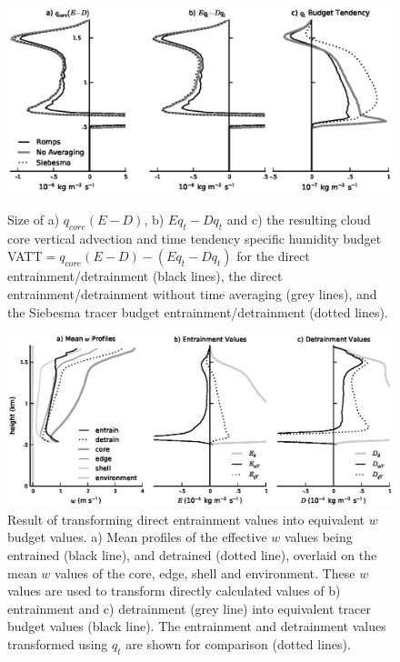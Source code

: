 \documentclass[12pt]{article}
\begin{document}
\begin{figure}[t]
  \noindent\includegraphics[width=39pc]{./figures/numerical_error}\\
  \caption{Size of a) $q_{core}(E-D)$, b) $Eq_t-Dq_t$ and c) the resulting 
  cloud core vertical advection and time tendency specific humidity budget 
  VATT$=q_{core}(E-D) - (Eq_t-Dq_t)$ for the direct entrainment/detrainment 
  (black lines), the direct entrainment/detrainment without time averaging 
  (grey lines), and the Siebesma tracer budget entrainment/detrainment 
  (dotted lines).}
  \label{fig:numerical_error}
\end{figure}

\begin{figure}[t]
  \noindent\includegraphics[width=39pc]{./figures/reynolds_correction_w}
  \caption{Result of transforming direct entrainment values into equivalent 
  $w$ budget values.  a) Mean profiles of the effective $w$ values being
  entrained (black line), and detrained (dotted line), overlaid on the mean 
  $w$ values of the core, edge, shell and environment.  These $w$ values are
  used to transform directly calculated values of b) entrainment and 
  c) detrainment (grey line) into equivalent tracer budget values (black 
  line).  The entrainment and detrainment values transformed using $q_t$ 
  are shown for comparison (dotted lines).}
  \label{fig:Reynolds_correction_w}
\end{figure}
\end{document}
